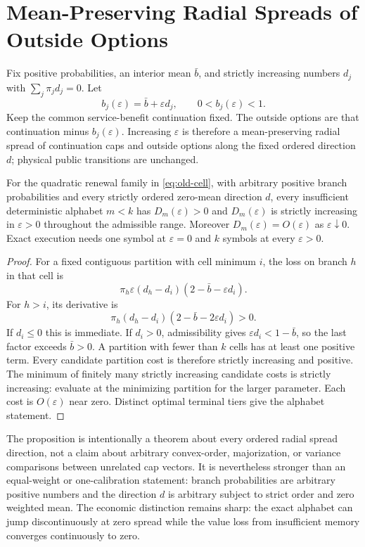 \section{Mean-Preserving Radial Spreads of Outside Options}
Fix positive probabilities, an interior mean $\bar b$, and strictly increasing numbers $d_j$ with $\sum_j\pi_jd_j=0$. Let
\begin{equation}\label{eq:dispersion-family}
 b_j(\varepsilon)=\bar b+\varepsilon d_j,
 \qquad 0<b_j(\varepsilon)<1.
\end{equation}
Keep the common service-benefit continuation fixed. The outside options are that continuation minus $b_j(\varepsilon)$. Increasing $\varepsilon$ is therefore a mean-preserving radial spread of continuation caps and outside options along the fixed ordered direction $d$; physical public transitions are unchanged.

\begin{proposition}\label{prop:dispersion}
For the quadratic renewal family in \eqref{eq:old-cell}, with arbitrary positive branch probabilities and every strictly ordered zero-mean direction $d$, every insufficient deterministic alphabet $m<k$ has $D_m(\varepsilon)>0$ and $D_m(\varepsilon)$ is strictly increasing in $\varepsilon>0$ throughout the admissible range. Moreover $D_m(\varepsilon)=O(\varepsilon)$ as $\varepsilon\downarrow0$. Exact execution needs one symbol at $\varepsilon=0$ and $k$ symbols at every $\varepsilon>0$.
\end{proposition}
\begin{proof}
For a fixed contiguous partition with cell minimum $i$, the loss on branch $h$ in that cell is
\[
 \pi_h\varepsilon(d_h-d_i)(2-\bar b-\varepsilon d_i).
\]
For $h>i$, its derivative is
\[
 \pi_h(d_h-d_i)(2-\bar b-2\varepsilon d_i)>0.
\]
If $d_i\leq0$ this is immediate. If $d_i>0$, admissibility gives $\varepsilon d_i<1-\bar b$, so the last factor exceeds $\bar b>0$. A partition with fewer than $k$ cells has at least one positive term. Every candidate partition cost is therefore strictly increasing and positive. The minimum of finitely many strictly increasing candidate costs is strictly increasing: evaluate at the minimizing partition for the larger parameter. Each cost is $O(\varepsilon)$ near zero. Distinct optimal terminal tiers give the alphabet statement.
\end{proof}

The proposition is intentionally a theorem about every ordered radial spread direction, not a claim about arbitrary convex-order, majorization, or variance comparisons between unrelated cap vectors. It is nevertheless stronger than an equal-weight or one-calibration statement: branch probabilities are arbitrary positive numbers and the direction $d$ is arbitrary subject to strict order and zero weighted mean. The economic distinction remains sharp: the exact alphabet can jump discontinuously at zero spread while the value loss from insufficient memory converges continuously to zero.